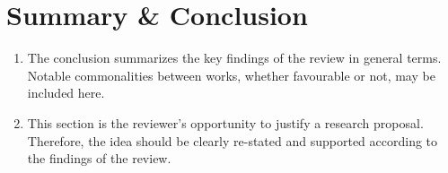 \documentclass[a4paper,11pt]{article}
\begin{document}
\section{Summary \& Conclusion}

\begin{enumerate}
    \item The conclusion summarizes the key findings of the review in general terms. Notable commonalities between works, whether favourable or not, may be included here.
    \item This section is the reviewer’s opportunity to justify a research proposal. Therefore, the idea should be clearly re-stated and supported according to the findings of the review.
\end{enumerate}




\small
\end{document}
